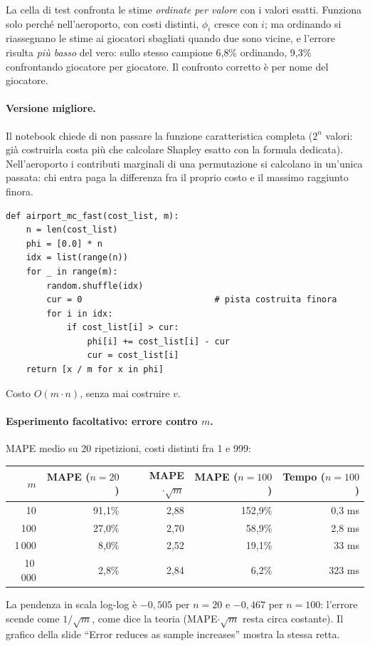 \begin{attenzione}
La cella di test confronta le stime \emph{ordinate per valore} con i valori esatti. Funziona
solo perché nell'aeroporto, con costi distinti, $\phi_i$ cresce con $i$; ma ordinando si
riassegnano le stime ai giocatori sbagliati quando due sono vicine, e l'errore risulta
\emph{più basso} del vero: sullo stesso campione 6{,}8\% ordinando, 9{,}3\% confrontando
giocatore per giocatore. Il confronto corretto è per nome del giocatore.
\end{attenzione}

\paragraph{Versione migliore.}
Il notebook chiede di non passare la funzione caratteristica completa ($2^n$ valori: già
costruirla costa più che calcolare Shapley esatto con la formula dedicata). Nell'aeroporto i
contributi marginali di una permutazione si calcolano in un'unica passata: chi entra paga
la differenza fra il proprio costo e il massimo raggiunto finora.
\begin{lstlisting}
def airport_mc_fast(cost_list, m):
    n = len(cost_list)
    phi = [0.0] * n
    idx = list(range(n))
    for _ in range(m):
        random.shuffle(idx)
        cur = 0                          # pista costruita finora
        for i in idx:
            if cost_list[i] > cur:
                phi[i] += cost_list[i] - cur
                cur = cost_list[i]
    return [x / m for x in phi]
\end{lstlisting}
Costo $O(m \cdot n)$, senza mai costruire $v$.

\paragraph{Esperimento facoltativo: errore contro $m$.}
MAPE medio su 20 ripetizioni, costi distinti fra 1 e 999:
\begin{center}
\renewcommand{\arraystretch}{1.2}
\begin{tabular}{rrrrr}
\toprule
$m$ & MAPE ($n=20$) & MAPE$\cdot\sqrt{m}$ & MAPE ($n=100$) & Tempo ($n=100$) \\
\midrule
10     & 91{,}1\% & 2{,}88 & 152{,}9\% & 0,3 ms \\
100    & 27{,}0\% & 2{,}70 & 58{,}9\%  & 2,8 ms \\
1\,000  & 8{,}0\%  & 2{,}52 & 19{,}1\%  & 33 ms \\
10\,000 & 2{,}8\%  & 2{,}84 & 6{,}2\%   & 323 ms \\
\bottomrule
\end{tabular}
\end{center}
La pendenza in scala log-log è $-0{,}505$ per $n = 20$ e $-0{,}467$ per $n = 100$:
l'errore scende come $1/\sqrt{m}$, come dice la teoria (MAPE$\cdot\sqrt{m}$ resta
circa costante). Il grafico della slide ``Error reduces as sample increases'' mostra la
stessa retta.

